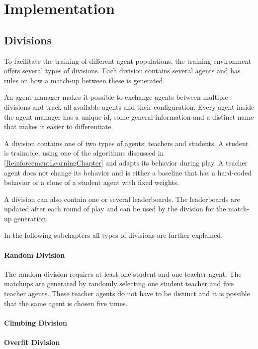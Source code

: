 \chapter{Implementation}

\section{Divisions}
To facilitate the training of different agent populations, the training environment offers several types of divisions. Each division contains several agents and has rules on how a match-up between these is generated.

An agent manager makes it possible to exchange agents between multiple divisions and track all available agents and their configuration. Every agent inside the agent manager has a unique id, some general information and a distinct name that makes it easier to differentiate.

A division contains one of two types of agents; teachers and students. A student is trainable, using one of the algorithms discussed in \ref{ReinforcementLearningChapter} and adapts its behavior during play. A teacher agent does not change its behavior and is either a baseline that has a hard-coded behavior or a clone of a student agent with fixed weights.

A division can also contain one or several leaderboards. The leaderboards are updated after each round of play and can be used by the division for the match-up generation.

In the following subchapters all types of divisions are further explained.

\subsubsection{Random Division}
The random division requires at least one student and one teacher agent. The matchups are generated by randomly selecting one student teacher and five teacher agents. These teacher agents do not have to be distinct and it is possible that the same agent is chosen five times.

\subsubsection{Climbing Division}
\subsubsection{Overfit Division}
